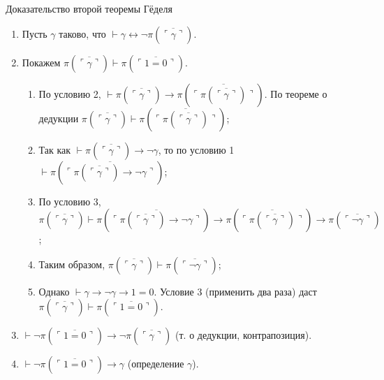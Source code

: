 \documentclass[aspectratio=169]{beamer}
\begin{document}
\begin{frame}{Доказательство второй теоремы Гёделя}
\begin{enumerate}
\item Пусть $\gamma$ таково, что $\vdash \gamma \leftrightarrow \neg\pi(\overline{\ulcorner\gamma\urcorner})$.
\item Покажем $\pi(\overline{\ulcorner\gamma\urcorner})\vdash \pi(\overline{\ulcorner 1=0\urcorner})$. 

\begin{enumerate}
\item По условию 2, $\vdash \pi(\overline{\ulcorner\gamma\urcorner}) \rightarrow \pi(\overline{\ulcorner\pi(\overline{\ulcorner\gamma\urcorner})\urcorner})$.
По теореме о дедукции $\pi(\overline{\ulcorner\gamma\urcorner})\vdash \pi(\overline{\ulcorner\pi(\overline{\ulcorner\gamma\urcorner})\urcorner})$;

\item Так как $\vdash \pi(\overline{\ulcorner\gamma\urcorner})\rightarrow\neg\gamma$, то 
по условию 1 $\vdash \pi(\overline{\ulcorner\pi(\overline{\ulcorner\gamma\urcorner})\rightarrow\neg\gamma\urcorner})$;

\item По условию 3, $\pi(\overline{\ulcorner\gamma\urcorner})\vdash \pi(\overline{\ulcorner\pi(\overline{\ulcorner\gamma\urcorner})\rightarrow\neg\gamma\urcorner})\rightarrow
\pi(\overline{\ulcorner\pi(\overline{\ulcorner\gamma\urcorner})\urcorner}) \rightarrow 
\pi(\overline{\ulcorner\neg\gamma\urcorner})$;

\item Таким образом, $\pi(\overline{\ulcorner\gamma\urcorner})\vdash\pi(\overline{\ulcorner\neg\gamma\urcorner})$;

\item Однако $\vdash \gamma\rightarrow\neg\gamma\rightarrow 1=0$. Условие 3 (применить два раза) даст $\pi(\overline{\ulcorner\gamma\urcorner})\vdash \pi(\overline{\ulcorner 1=0 \urcorner})$.
\end{enumerate}

\item $\vdash \neg\pi(\overline{\ulcorner 1=0 \urcorner})\rightarrow\neg\pi(\overline{\ulcorner\gamma\urcorner})$ (т. о дедукции, контрапозиция).
\item $\vdash \neg\pi(\overline{\ulcorner 1=0 \urcorner})\rightarrow\gamma$ (определение $\gamma$).
\end{enumerate}
\end{frame}
\end{document}
